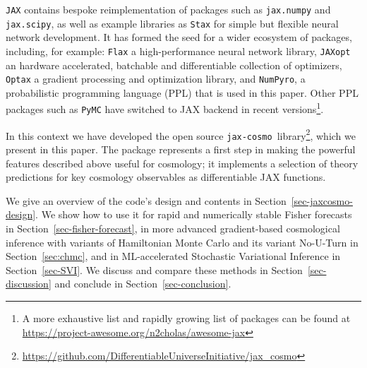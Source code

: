\documentclass[twocolumn,twocolappendix,nofootinbib,iop]{openjournal}
\newcommand{\numpyro}{\texttt{NumPyro}}
\newcommand{\jaxcosmo}{\texttt{jax-cosmo}}
\begin{document}
\texttt{JAX} contains bespoke reimplementation of packages such as \texttt{jax.numpy} and \texttt{jax.scipy}, as well as example libraries as \texttt{Stax} for simple but flexible neural network development. It has formed the seed for a wider ecosystem of packages, including, for example: 
\texttt{Flax} \citep{flax2020github} a high-performance neural network library, \texttt{JAXopt} \citep{jaxopt_implicit_diff} an hardware accelerated, batchable and differentiable collection of optimizers, \texttt{Optax} \citep{optax2020github} a gradient processing and optimization library, and \numpyro \citep{phan2019composable,bingham2019pyro}, a probabilistic programming language (PPL) that is used in this paper. Other PPL packages such as \texttt{PyMC} \citep{Salvatier2016} have switched to JAX backend in recent versions\footnote{A more exhaustive list and rapidly growing list of packages can be found at \url{https://project-awesome.org/n2cholas/awesome-jax}}.


In this context we have developed the open source \jaxcosmo\ library\footnote{\url{https://github.com/DifferentiableUniverseInitiative/jax_cosmo}}, which we present in this paper. The package represents a first step in making the powerful features described above useful for cosmology; it implements a selection of theory predictions for key cosmology observables as differentiable JAX functions.


We give an overview of the code's design and contents in Section~\ref{sec-jaxcosmo-design}. We show how to use it for rapid and numerically stable Fisher forecasts in Section~\ref{sec-fisher-forecast}, in more advanced gradient-based cosmological inference with variants of Hamiltonian Monte Carlo and its variant No-U-Turn in Section~\ref{sec:chmc}, and in ML-accelerated Stochastic Variational Inference in Section~\ref{sec-SVI}. We discuss and compare these methods in Section~\ref{sec-discussion} and conclude in Section~\ref{sec-conclusion}.
\end{document}
